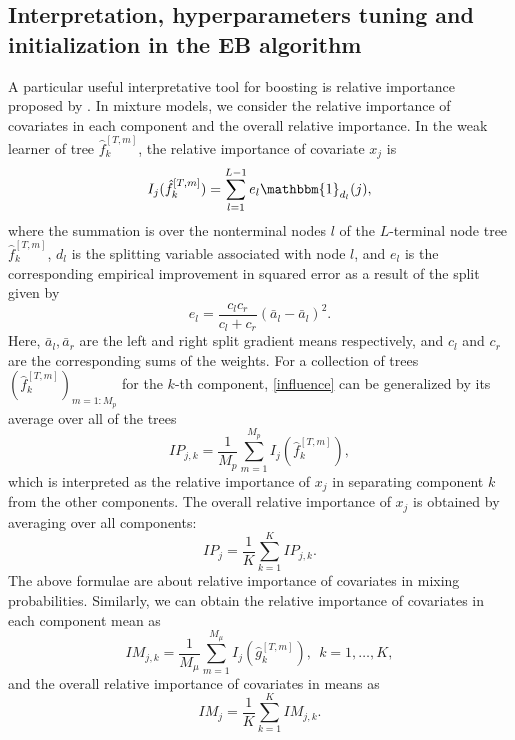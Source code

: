 \documentclass[11pt]{article}
\numberwithin{equation}{section}
\begin{document}
\subsection{Interpretation, hyperparameters tuning and initialization in the EB algorithm}
A particular useful interpretative tool for boosting is relative importance proposed by \cite{breiman1983classification}.
In mixture models, we consider the relative importance of covariates in each component and the overall relative importance.
In the weak learner of tree $\hat{f}_k^{[T,m]}$,  the relative importance of covariate $x_j$ is
\begin{equation}\label{influence}
	I_j(\hat{f}_k^{[T,m]})=\sum_{l=1}^{L-1}{e}_l\mathbbm{1}_{d_l}(j),
\end{equation}
where the summation is over the nonterminal nodes $l$ of the $L$-terminal node tree $\hat{f}^{[T,m]}_k$, $d_l$ is the splitting variable associated with node $l$, and $e_l$ is the corresponding empirical improvement in squared error as a result of the split given by 
$$e_l=\frac{c_lc_r}{c_l+c_r}(\bar{a}_l-\bar{a}_l)^2.$$
Here, $\bar{a}_l,\bar{a}_r$ are the left and right split gradient means respectively, and $c_l$ and $c_r$ are the corresponding sums of the weights.
For a collection of trees $(\hat{f}^{[T,m]}_k)_{m=1:M_p}$ for the $k$-th component, \eqref{influence} can be generalized by its average over all of the trees
\begin{equation}
	IP_{j,k}=\frac{1}{M_p}\sum_{m=1}^{M_p} I_j(\hat{f}_k^{[T,m]}),
\end{equation}
which is interpreted as the relative importance of $x_j$ in separating component $k$ from the other components.
The overall relative importance of $x_j$ is obtained by averaging over all components:
$$
IP_{j}=\frac{1}{K}\sum_{k=1}^K IP_{j,k}.
$$
The above formulae are about relative importance of covariates in mixing probabilities. Similarly, we can obtain the relative importance of covariates in each component mean as
\begin{equation}
	IM_{j,k}=\frac{1}{M_\mu}\sum_{m=1}^{M_\mu} I_j(\hat{g}_k^{[T,m]}),~~ k=1,\ldots,K,
\end{equation}
and the overall relative importance of covariates in means as
$$
IM_{j}=\frac{1}{K}\sum_{k=1}^K IM_{j,k}.
$$
\end{document}
